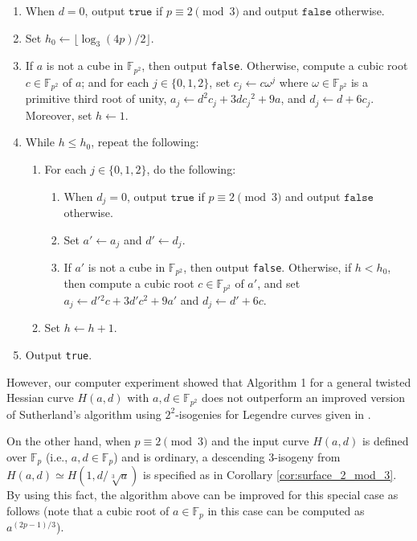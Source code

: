 \documentclass{article}
\theoremstyle{definition}
\newcommand{\FF}{\mathbb{F}}
\begin{document}
\begin{enumerate}
\item
When $d = 0$, output $\texttt{true}$ if $p \equiv 2 \pmod{3}$ and output $\texttt{false}$ otherwise.
\item
Set $h_0 \leftarrow \lfloor \log_3(4p) / 2 \rfloor$.
\item
If $a$ is not a cube in $\FF_{p^2}$, then output \texttt{false}.
Otherwise, compute a cubic root $c \in \FF_{p^2}$ of $a$; and for each $j \in \{0,1,2\}$, set $c_j \leftarrow c \omega^j$ where $\omega \in \FF_{p^2}$ is a primitive third root of unity, $a_j \leftarrow d^2 c_j + 3 d c_j{}^2 + 9 a$, and $d_j \leftarrow d + 6 c_j$.
Moreover, set $h \leftarrow 1$.
\item
While $h \leq h_0$, repeat the following:
\begin{enumerate}
\item
For each $j \in \{0,1,2\}$, do the following:
\begin{enumerate}
\item
When $d_j = 0$, output $\texttt{true}$ if $p \equiv 2 \pmod{3}$ and output $\texttt{false}$ otherwise.
\item
Set $a' \leftarrow a_j$ and $d' \leftarrow d_j$.
\item
If $a'$ is not a cube in $\FF_{p^2}$, then output \texttt{false}.
Otherwise, if $h < h_0$, then compute a cubic root $c \in \FF_{p^2}$ of $a'$, and set $a_j \leftarrow d'{}^2 c + 3 d' c^2 + 9 a'$ and $d_j \leftarrow d' + 6 c$.
\end{enumerate}
\item
Set $h \leftarrow h + 1$.
\end{enumerate}
\item
Output \texttt{true}.
\end{enumerate}
However, our computer experiment showed that Algorithm 1 for a general twisted Hessian curve $H(a,d)$ with $a,d \in \FF_{p^2}$ does not outperform an improved version of Sutherland's algorithm using $2^2$-isogenies for Legendre curves given in \cite{DBLP:conf/casc/HashimotoN21,DBLP:journals/ieiceta/HashimotoN23}.

On the other hand, when $p \equiv 2 \pmod{3}$ and the input curve $H(a,d)$ is defined over $\FF_p$ (i.e., $a,d \in \FF_p$) and is ordinary, a descending $3$-isogeny from $H(a,d) \simeq H(1,d / \sqrt[3]{a})$ is specified as in Corollary \ref{cor:surface_2_mod_3}.
By using this fact, the algorithm above can be improved for this special case as follows (note that a cubic root of $a \in \FF_p$ in this case can be computed as $a^{(2p-1)/3}$).
\end{document}
